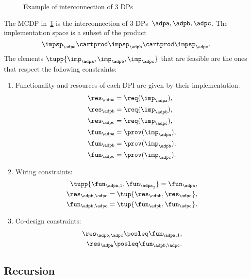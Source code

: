 \begin{figure}
	\centering
	\caption{Example of interconnection of 3 DPs}
	\label{fig:exampleq}
\end{figure}
\begin{example}
	The MCDP in~\cref{fig:exampleq} is the interconnection of 3
	DPs~$\adpa,\adpb,\adpc$.
	The implementation space is a subset of the product
	\begin{equation}
		\impsp_\adpa \cartprod  \impsp_\adpb \cartprod \impsp_\adpc.
	\end{equation}
	The elements $\tupp{\imp_\adpa, \imp_\adpb, \imp_\adpc}$ that are feasible are the ones that respect the following constraints:
	\begin{enumerate}
		\item Functionality and resources of each DPI are given by their implementation:
		      \begin{align}
			      \res_\adpa & = \req(\imp_\adpa),  \\
			      \res_\adpb & = \req(\imp_\adpb),  \\
			      \res_\adpc & = \req(\imp_\adpc),  \\
			      \fun_\adpa & = \prov(\imp_\adpa), \\
			      \fun_\adpb & = \prov(\imp_\adpb), \\
			      \fun_\adpc & = \prov(\imp_\adpc).
		      \end{align}
		\item Wiring constraints:
		      \begin{align}
			      \tupp{\fun_{\adpa,1}, \fun_{\adpa_2}}  = \fun_\adpa, \\
			      \res_{\adpb,\adpc}=\tup{\res_\adpb,\res_\adpc},      \\
			      \fun_{\adpb,\adpc}=\tup{\fun_\adpb,\fun_\adpc}.
		      \end{align}
		\item Co-design constraints:
		      \begin{align}
			      \res_{\adpb,\adpc}\posleq \fun_{\adpa,1}, \\
			      \res_\adpa \posleq \fun_{\adpb,\adpc}.
		      \end{align}
	\end{enumerate}
\end{example}

\FloatBarrier\vfill\clearpage %

\subsection{Recursion}

